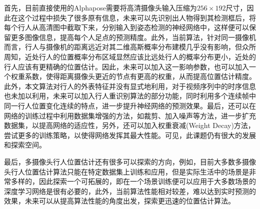 首先，目前直接使用的Alphapose需要将高清摄像头输入压缩为$256\times 192$尺寸，因此在这个过程中损失了很多原有信息，未来可以先识别出人物得到其检测框后，将每个行人从高清图中截取下来，分别输入到姿态检测的神经网络中，这样便可以保留更多图像信息，提高每个人足点的预测精度。此外，当前算法，针对同一摄像机而言，行人与摄像机的距离远近对其二维高斯概率分布建模几乎没有影响，但众所周知，近处行人的位置概率分布区域显然应该比远处行人的概率分布更小，近处的行人应该有更精确的位置估计。因此，未来可以加入这一影响参数，也可以加入一个权重系数，使得距离摄像头更近的节点有更高的权重，从而提高位置估计精度。此外，本文算法对行人的外表特征并没有显式地利用，对于视频序列中的时序信息也未加以利用，未来可以加入行人重识别算法的部分功能，同时利用多个连续帧中同一行人位置变化连续的特点，进一步提升神经网络的预测效果。最后，还可以在网络的训练过程中利用数据集增强的方法，如裁剪、加入噪声等方法，进一步扩充数据集，以提高网络的适应性，另外，还可以加入权重衰减(Weight Decay)方法，尝试更多的训练策略，以使得网络发挥其最大性能。可见，此课题仍有很大的发展和探索空间。

最后，多摄像头行人位置估计还有很多可以探索的方向，例如，目前大多数多摄像头行人位置估计算法只能在特定数据集上训练和应用，但是实际生活中的场景是非常多样的，因此探索一个可拓展的，即在一个场景训练便可以应用于大多数场景的深度学习网络是很有必要的，此外，当前算法性能相对较差，难以达到实时预测的效果，未来可以从提高算法性能的角度出发，探索更迅速的位置估计算法。